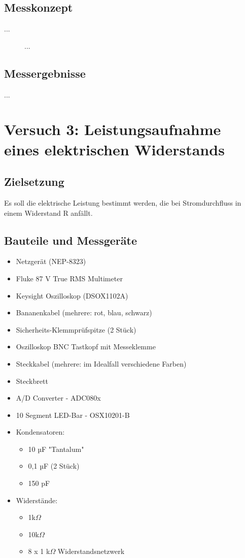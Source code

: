 \documentclass[a4paper,12pt]{article}
\begin{document}
\subsection{Messkonzept}
...

\begin{figure}[H]
    \centering
\caption{...}
\end{figure}


\subsection{Messergebnisse}
...

\section{Versuch 3: Leistungsaufnahme eines elektrischen Widerstands}
\subsection{Zielsetzung}
Es soll die elektrische Leistung bestimmt werden, die bei Stromdurchfluss in
einem Widerstand R anfällt.

\subsection{Bauteile und Messgeräte}
\begin{itemize}
\item Netzgerät (NEP-8323)
\item Fluke 87 V True RMS Multimeter
\item Keysight Oszilloskop (DSOX1102A)
\item Bananenkabel (mehrere: rot, blau, schwarz)
\item Sicherheits-Klemmprüfspitze (2 Stück)
\item Oszilloskop BNC Tastkopf mit Messeklemme
\item Steckkabel (mehrere: im Idealfall verschiedene Farben)
\item Steckbrett\\
\end{itemize}


\begin{itemize}
\item A/D Converter - ADC080x
\item 10 Segment LED-Bar - OSX10201-B
\newpage
\item Kondensatoren: 
	\begin{itemize}
	\item 10 µF "Tantalum"
	\item 0,1 µF (2 Stück)
	\item 150 pF
	\end{itemize}
\item Widerstände: 
	\begin{itemize}
	\item 1k$\Omega$
	\item 10k$\Omega$
	\item 8 x 1 k$\Omega$ Widerstandsnetzwerk
	\end{itemize}
\end{itemize}
\end{document}
